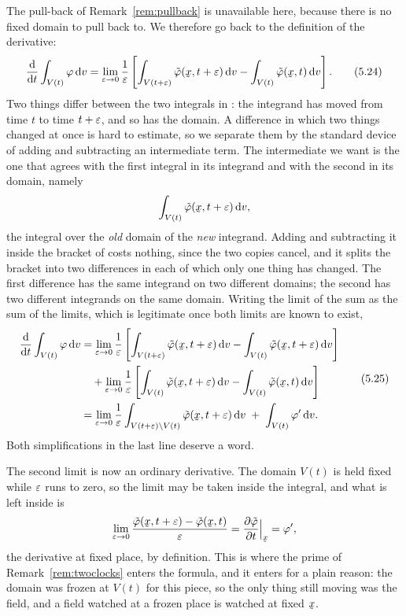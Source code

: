 The pull-back of Remark~\ref{rem:pullback} is unavailable here, because
there is no fixed domain to pull back to. We therefore go back to the
definition of the derivative:
\begin{equation}
   \frac{\dl}{\dl t}\int_{V(t)}\varphi\,\dl v
   =\lim_{\eps\to0}\frac1\eps\left[
     \int_{V(t+\eps)}\tilde\varphi(\bx,t+\eps)\,\dl v
     -\int_{V(t)}\tilde\varphi(\bx,t)\,\dl v\right].
   \tag{5.24}\label{eq:5.24}
\end{equation}
Two things differ between the two integrals in : the integrand
has moved from time $t$ to time $t+\varepsilon$, and so has the domain. A
difference in which two things changed at once is hard to estimate, so we
separate them by the standard device of adding and subtracting an
intermediate term. The intermediate we want is the one that agrees with
the first integral in its integrand and with the second in its domain,
namely
\[
   \int_{V(t)}\tilde\varphi(\bx,t+\eps)\,\dl v ,
\]
the integral over the \emph{old} domain of the \emph{new} integrand.
Adding and subtracting it inside the bracket of  costs nothing,
since the two copies cancel, and it splits the bracket into two
differences in each of which only one thing has changed. The first
difference has the same integrand on two different domains; the second has
two different integrands on the same domain. Writing the limit of the sum
as the sum of the limits, which is legitimate once both limits are known
to exist,
\begin{equation}
\begin{aligned}
   \frac{\dl}{\dl t}\int_{V(t)}\varphi\,\dl v
   &=\lim_{\eps\to0}\frac1\eps\left[
     \int_{V(t+\eps)}\tilde\varphi(\bx,t+\eps)\,\dl v
     -\int_{V(t)}\tilde\varphi(\bx,t+\eps)\,\dl v\right]\\
   &\quad+\lim_{\eps\to0}\frac1\eps\left[
     \int_{V(t)}\tilde\varphi(\bx,t+\eps)\,\dl v
     -\int_{V(t)}\tilde\varphi(\bx,t)\,\dl v\right]\\
   &=\lim_{\eps\to0}\frac1\eps
     \int_{V(t+\eps)\setminus V(t)}\tilde\varphi(\bx,t+\eps)\,\dl v
     \;+\;\int_{V(t)}\varphi'\,\dl v .
\end{aligned}
   \tag{5.25}\label{eq:5.25}
\end{equation}
Both simplifications in the last line deserve a word.

The second limit is now an ordinary derivative. The domain $V(t)$ is held
fixed while $\varepsilon$ runs to zero, so the limit may be taken inside the
integral, and what is left inside is
\[
   \lim_{\eps\to0}\frac{\tilde\varphi(\bx,t+\eps)-\tilde\varphi(\bx,t)}{\eps}
   =\frac{\partial\tilde\varphi}{\partial t}\Big|_{\bx}=\varphi' ,
\]
the derivative at fixed place, by definition. This is where the prime of
Remark~\ref{rem:twoclocks} enters the formula, and it enters for a plain
reason: the domain was frozen at $V(t)$ for this piece, so the only thing
still moving was the field, and a field watched at a frozen place is
watched at fixed $\bx$.

